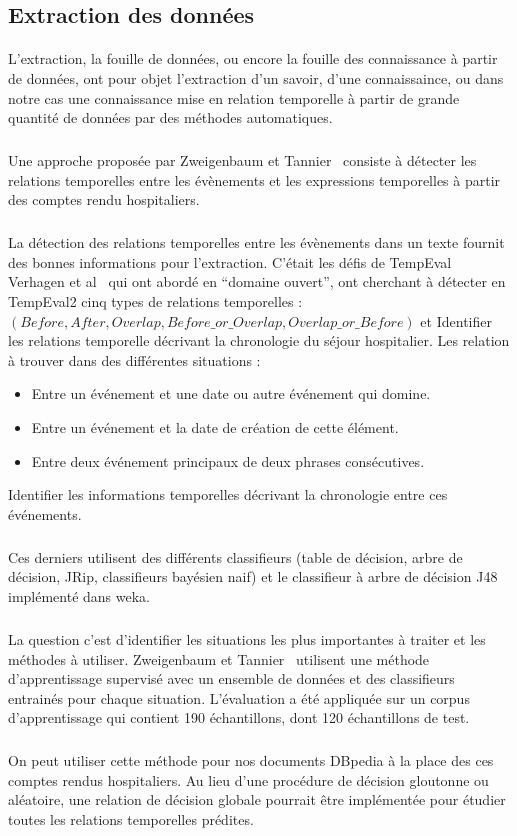 \subsection*{Extraction des données}
\paragraph{}
L'extraction, la fouille de données, ou encore la fouille des connaissance à partir de données, ont pour  objet l'extraction d'un savoir, d'une connaissaince, ou dans notre cas une connaissance mise en relation temporelle à partir de grande quantité de données par des méthodes automatiques.
\subparagraph{}
Une approche proposée par Zweigenbaum et Tannier~\cite{zweigenbaum2013} consiste à détecter les relations temporelles entre les évènements et les expressions temporelles à partir des comptes rendu hospitaliers.
\subparagraph{}
La détection des relations temporelles entre les évènements dans un texte fournit des bonnes informations pour l’extraction.
\newline
C’était les défis de TempEval Verhagen et al~\cite{verhagen2010} qui ont abordé en “domaine ouvert”, ont cherchant à détecter en TempEval2 cinq types de relations temporelles :
\newline
$(Before, After, Overlap, Before\_or\_Overlap, Overlap\_or\_Before)$
et Identifier les relations temporelle décrivant la chronologie du séjour hospitalier.
\newline
Les relation à trouver dans des différentes situations :
\begin{itemize}
\item{}Entre un événement et une date ou autre événement qui domine.
\item{}Entre un événement et la date de création de cette élément.
\item{}Entre deux événement principaux de deux phrases consécutives.
\end{itemize}
Identifier les informations temporelles décrivant la chronologie entre ces événements.
\subparagraph{}
Ces derniers utilisent des différents classifieurs (table de décision, arbre de décision, JRip, classifieurs bayésien naif) et le classifieur à arbre de décision J48 implémenté dans weka.
\subparagraph{}
La question c’est d’identifier les situations les plus importantes à traiter et les méthodes à utiliser.
Zweigenbaum et Tannier~\cite{zweigenbaum2013} utilisent une méthode d’apprentissage supervisé avec un ensemble de données et des classifieurs entrainés pour chaque situation. 
L'évaluation a été appliquée sur un corpus d’apprentissage qui contient 190 échantillons, dont 120 échantillons de test.
\subparagraph{}
On peut utiliser cette méthode pour nos documents DBpedia à la place des ces comptes rendus hospitaliers.
Au lieu d’une procédure de décision gloutonne ou aléatoire, une relation de décision globale pourrait être implémentée pour étudier toutes les relations temporelles prédites. 
